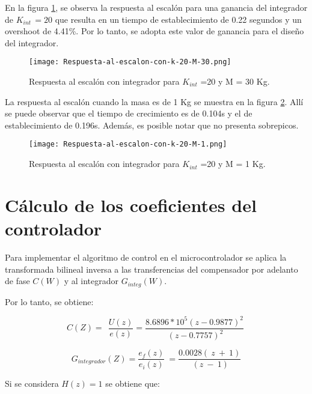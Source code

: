 \noindent En la figura \ref{fig:respuesta-al-escalon-con-k-20-M-30}, se observa la respuesta al escal\'{o}n para una ganancia del integrador de $K_{int\ }=20$ que resulta en un tiempo de establecimiento de 0.22 segundos y un overshoot de 4.41\%. Por lo tanto, se adopta este valor de ganancia para el dise\~{n}o del integrador.

\begin{figure}[H]
	\centering
	\texttt{[image: Respuesta-al-escalon-con-k-20-M-30.png]}
	\caption{Respuesta al escalón con integrador para $K_{int}$ =20 y M = 30 Kg.}
	\label{fig:respuesta-al-escalon-con-k-20-M-30}
\end{figure}


\noindent La respuesta al escal\'{o}n cuando la masa es de 1 Kg se muestra en la figura \ref{fig:respuesta-al-escalon-con-k-20-M-1}. All\'{i} se puede observar que el tiempo de crecimiento es de 0.104s y el de establecimiento de 0.196s. Adem\'{a}s, es posible notar que no presenta sobrepicos.



\begin{figure}[H]
	\centering
	\texttt{[image: Respuesta-al-escalon-con-k-20-M-1.png]}
	\caption{Respuesta al escalón con integrador para $K_{int}$ =20 y M = 1 Kg.}
	\label{fig:respuesta-al-escalon-con-k-20-M-1}
\end{figure}


\section{Cálculo de los coeficientes del controlador}

\noindent Para implementar el algoritmo de control en el microcontrolador se aplica la transformada bilineal inversa a las transferencias del compensador por adelanto de fase $C(W)$ y al integrador $G_{integ}(W)$.

\noindent Por lo tanto, se obtiene:

\begin{equation} \label{GrindEQ__5_6_} 
	C(Z)=\ \ \frac{U(z)}{e(z)}=\frac{8.6896*10^5(z-0.9877)^2}{\ (z-0.7757)^2}\  
\end{equation} 

\begin{equation} \label{GrindEQ__5_7_} 
	G_{integrador}(Z)=\frac{e_f(z)}{e_i(z)}\ =\frac{0.0028(\ z\ +\ 1)}{\ (z\ -\ 1)} 
\end{equation} 

\noindent Si se considera $H(z)=1$ se obtiene que:


